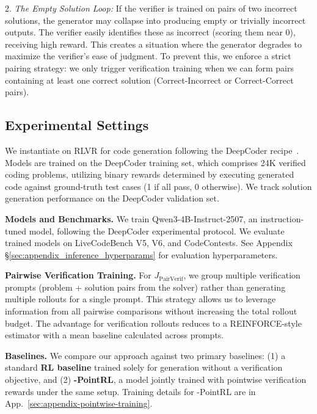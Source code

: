 2. \textit{The Empty Solution Loop:} If the verifier is trained on pairs of two incorrect solutions, the generator may collapse into producing empty or trivially incorrect outputs. The verifier easily identifies these as incorrect (scoring them near 0), receiving high reward. This creates a situation where the generator degrades to maximize the verifier's ease of judgment. To prevent this, we enforce a strict pairing strategy: we only trigger verification training when we can form pairs containing at least one correct solution (Correct-Incorrect or Correct-Correct pairs).


\subsection{Experimental Settings}

We instantiate \method{} on RLVR for code generation following the DeepCoder recipe~\citep{deepcoder2025}. Models are trained on the DeepCoder training set, which comprises 24K verified coding problems, utilizing binary rewards determined by executing generated code against ground-truth test cases (1 if all pass, 0 otherwise). We track solution generation performance on the DeepCoder validation set.

\textbf{Models and Benchmarks.} We train {Qwen3-4B-Instruct-2507}, an instruction-tuned model, following the DeepCoder experimental protocol. We evaluate trained models on LiveCodeBench V5, V6, and CodeContests. See Appendix \S\ref{sec:appendix_inference_hyperparams} for evaluation hyperparameters.


\textbf{Pairwise Verification Training.} For $J_{\text{PairVerif}}$, we group multiple verification prompts (problem + solution pairs from the solver) rather than generating multiple rollouts for a single prompt. This strategy allows us to leverage information from all pairwise comparisons without increasing the total rollout budget. The advantage for verification rollouts reduces to a REINFORCE-style estimator with a mean baseline calculated across prompts.

\textbf{Baselines.} We compare our approach against two primary baselines: (1) a standard \textbf{RL baseline} trained solely for generation without a verification objective, and (2) \textbf{\method{}-PointRL}, a model jointly trained with pointwise verification rewards under the same setup. Training details for \method{}-PointRL are in App.~\ref{sec:appendix-pointwise-training}.

